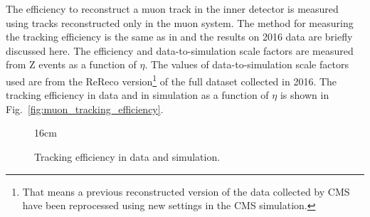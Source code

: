 
The efficiency to reconstruct a muon track in the inner detector is measured using tracks reconstructed only in the muon system. The method for measuring the tracking efficiency is the same as in \cite{bib:CMS-AN-15-215} and the results on 2016 data are briefly discussed here. The efficiency and data-to-simulation scale factors are measured from Z events as a function of $\eta$. The values of data-to-simulation scale factors used are from the ReReco version\footnote{That means a previous reconstructed version of the data collected by CMS have been reprocessed using new settings in the CMS simulation.} of the full dataset collected in 2016. The tracking efficiency in data and in simulation as a function of $\eta$ is shown in Fig.~\ref{fig:muon_tracking_efficiency}.

\begin{figure}[hbtp]{16cm}
	\caption{Tracking efficiency in data and simulation.}
	\centering
	\quad

\end{figure}
